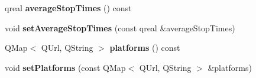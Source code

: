 \begin{DoxyCompactItemize}
\item 
\mbox{\label{classStationEngine_1_1Station_a4747748868a77baad4dd01daac657fcf}} 
qreal {\bfseries average\+Stop\+Times} () const
\item 
\mbox{\label{classStationEngine_1_1Station_a18cdb01a71d2b17cbfdcc2a67a028a8a}} 
void {\bfseries set\+Average\+Stop\+Times} (const qreal \&average\+Stop\+Times)
\item 
\mbox{\label{classStationEngine_1_1Station_abc2d6647137da855d877a7061a261bc8}} 
Q\+Map$<$ Q\+Url, Q\+String $>$ {\bfseries platforms} () const
\item 
\mbox{\label{classStationEngine_1_1Station_ab275347465eb810b7c8f2a6e1802feb4}} 
void {\bfseries set\+Platforms} (const Q\+Map$<$ Q\+Url, Q\+String $>$ \&platforms)
\end{DoxyCompactItemize}
